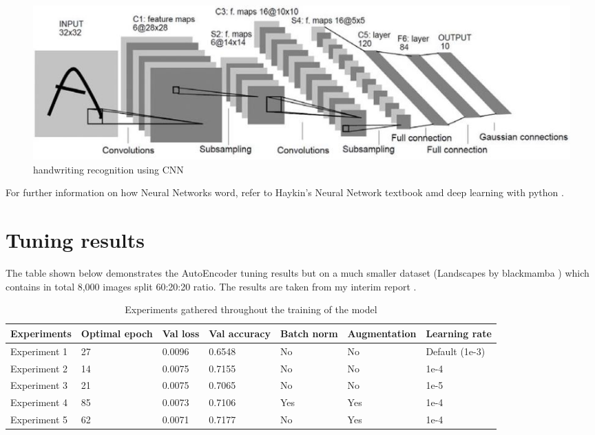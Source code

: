 \begin{figure}[H]
    \centering
    \includegraphics[width=0.7\columnwidth]{sections/figures/cnn.JPG}
    \caption{handwriting recognition using CNN \cite{berus_2018}}
    \label{fig:my_label}
\end{figure}



For further information on how Neural Networks word, refer to Haykin's Neural Network textbook \cite{haykin2009neural} amd deep learning with python \cite{franoischollet2017learning}.


\pagebreak
\section*{Tuning results}
The table shown below demonstrates the AutoEncoder tuning results but on a much smaller dataset (Landscapes by blackmamba \cite{landscape}) which contains in total 8,000 images split 60:20:20 ratio. The results are taken from my interim report \cite{mrehm001}. 
\begin{table}[H]
\Huge
\bfseries
\def\arraystretch{2}
\setlength{\tabcolsep}{10pt}
\begin{adjustbox}{width=\textwidth}
\begin{tabular}{|l|l|l|l|l|l|l|}
\hline
Experiments & Optimal epoch & Val loss & Val accuracy & Batch norm & Augmentation & Learning rate \\ \hline
Experiment 1 & 27 & 0.0096 & 0.6548 & No  & No  & Default (1e-3) \\ \hline
Experiment 2 & 14 & 0.0075 & 0.7155 & No  & No  & 1e-4           \\ \hline
Experiment 3 & 21 & 0.0075 & 0.7065 & No  & No  & 1e-5           \\ \hline
Experiment 4 & 85 & 0.0073 & 0.7106 & Yes & Yes & 1e-4           \\ \hline
Experiment 5 & 62 & 0.0071 & 0.7177 & No  & Yes & 1e-4           \\ \hline
\end{tabular}

\end{adjustbox}
\caption{Experiments gathered throughout the training of the model}
\end{table}

